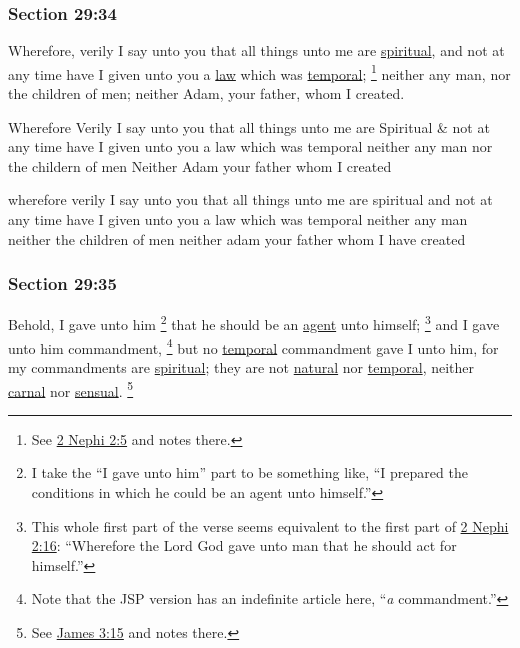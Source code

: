 	\subsubsection{Section 29:34} %
		\label{DC29-34}

		Wherefore, verily I say unto you that all things unto me are \hyperref[SPIRITUAL]{spiritual}, and not at any time have I given unto you a \hyperref[LAW]{law} which was \hyperref[TEMPORAL]{temporal};%
			\footnote{%
				See \hyperref[2NEPHI-2-5]{2 Nephi 2:5} and notes there.
				}
		neither any man, nor the children of men; neither Adam, your father, whom I created.

		\begin{framed}
		\scriptsize
			\begin{compactdesc}
				\item[JSP] Wherefore Verily I say unto you that all things unto me are Spiritual \& not at any time have I given unto you a law which was temporal neither any man nor the childern of men Neither Adam your father whom I created
				\item[HSN] wherefore verily I say unto you that all things unto me are spiritual and not at any time have I given unto you a law which was temporal neither any man neither the children of men neither adam your father whom I have created
			\end{compactdesc}
		\end{framed}

	\subsubsection{Section 29:35} %
		\label{DC29-35}

		Behold, I gave unto him%
			\footnote{%
				I take the ``I gave unto him'' part to be something like, ``I prepared the conditions in which he could be an agent unto himself.''
				}
		that he should be an \hyperref[AGENCY]{agent} unto himself;%
			\footnote{%
				This whole first part of the verse seems equivalent to the first part of \hyperref[2NEPHI-2-16]{2 Nephi 2:16}: ``Wherefore the Lord God gave unto man that he should act for himself.''
				}
		and I gave unto him commandment,%
			\footnote{%
				Note that the JSP version has an indefinite article here, ``\textit{a} commandment.''
				}
		but no \hyperref[TEMPORAL]{temporal} commandment gave I unto him, for my commandments are \hyperref[SPIRITUAL]{spiritual}; they are not \hyperref[NATURAL]{natural} nor \hyperref[TEMPORAL]{temporal}, neither \hyperref[CARNAL]{carnal} nor \hyperref[SENSUAL]{sensual}.%
			\footnote{%
				See \hyperref[JAMES-3-15]{James 3:15} and notes there.
				}

